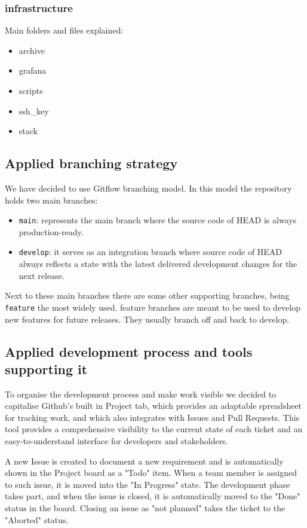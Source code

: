 \subsubsection{infrastructure}
Main folders and files explained:
\begin{itemize}
    \item archive
    \item grafana
    \item scripts
    \item ssh\_key
    \item stack
\end{itemize}
    
    
\subsection{Applied branching strategy}
We have decided to use Gitflow branching model\cite{nvie2010git}. In this model the repository holds two main branches:
\begin{itemize}
    \item \texttt{main}: represents the main branch where the source code of HEAD is always production-ready.
    \item \texttt{develop}: it serves as an integration branch where source code of HEAD always reflects a state with the latest delivered development changes for the next release.
\end{itemize}
Next to these main branches there are some other supporting branches, being \texttt{feature} the most widely used. feature branches are meant to be used to develop new features for future releases. They usually branch off and back to develop.

\subsection{Applied development process and tools supporting it}
To organise the development process and make work visible we decided to capitalise Github's built in Project tab, which provides an adaptable spreadsheet for tracking work, and which also integrates with Issues and Pull Requests. This tool provides a comprehensive visibility to the current state of each ticket and an easy-to-understand interface for developers and stakeholders.

A new Issue is created to document a new requirement and is automatically shown in the Project board as a "Todo" item. When a team member is assigned to such issue, it is moved into the "In Progress" state. The development phase takes part, and when the issue is closed, it is automatically moved to the "Done" status in the board. Closing an issue as "not planned" takes the ticket to the "Aborted" status.

